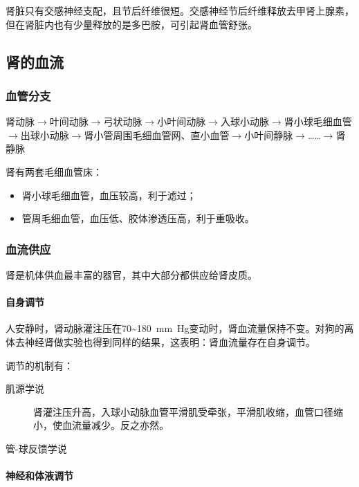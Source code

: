 肾脏只有交感神经支配，且节后纤维很短。交感神经节后纤维释放去甲肾上腺素，但在肾脏内也有少量释放的是多巴胺，可引起肾血管舒张。

\subsection{肾的血流}

\subsubsection{血管分支}

肾动脉$\longrightarrow$叶间动脉$\longrightarrow$弓状动脉$\longrightarrow$小叶间动脉$\longrightarrow$入球小动脉$\longrightarrow$肾小球毛细血管$\longrightarrow$出球小动脉$\longrightarrow$肾小管周围毛细血管网、直小血管$\longrightarrow$小叶间静脉$\longrightarrow$……$\longrightarrow$肾静脉

肾有两套毛细血管床：
\begin{itemize}
	\item 肾小球毛细血管，血压较高，利于滤过；
	\item 管周毛细血管，血压低、胶体渗透压高，利于重吸收。
\end{itemize}

\subsubsection{血流供应}

肾是机体供血最丰富的器官，其中大部分都供应给肾皮质。

\paragraph{自身调节}

人安静时，肾动脉灌注压在70\textasciitilde\SI{180}{\mm Hg}变动时，肾血流量保持不变。对狗的离体去神经肾做实验也得到同样的结果，这表明：肾血流量存在自身调节。

调节的机制有：
\begin{description}
	\item[肌源学说] 肾灌注压升高，入球小动脉血管平滑肌受牵张，平滑肌收缩，血管口径缩小，使血流量减少。反之亦然。
	\item[管-球反馈学说] 
\end{description}

\paragraph{神经和体液调节}

